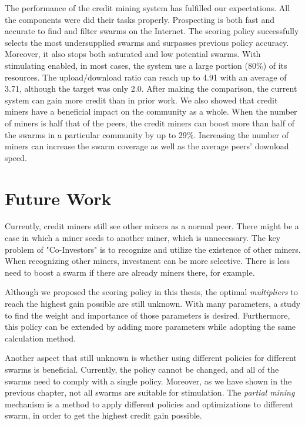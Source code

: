 The performance of the credit mining system has fulfilled our expectations. All the components were did their tasks properly. Prospecting is both fast and accurate to find and filter swarms on the Internet. The scoring policy successfully selects the most undersupplied swarms and surpasses previous policy accuracy. Moreover, it also stops both saturated and low potential swarms. With stimulating enabled, in most cases, the system use a large portion (80\%) of its resources. The upload/download ratio can reach up to 4.91 with an average of 3.71, although the target was only 2.0. After making the comparison, the current system can gain more credit than in prior work. We also showed that credit miners have a beneficial impact on the community as a whole. When the number of miners is half that of the peers, the credit miners can boost more than half of the swarms in a particular community by up to 29\%. Increasing the number of miners can increase the swarm coverage as well as the average peers' download speed.

\section{Future Work}
Currently, credit miners still see other miners as a normal peer. There might be a case in which a miner seeds to another miner, which is unnecessary. The key problem of "Co-Investors" is to recognize and utilize the existence of other miners. When recognizing other miners, investment can be more selective. There is less need to boost a swarm if there are already miners there, for example. 

Although we proposed the scoring policy in this thesis, the optimal \textit{multipliers} to reach the highest gain possible are still unknown. With many parameters, a study to find the weight and importance of those parameters is desired. Furthermore, this policy can be extended by adding more parameters while adopting the same calculation method.

Another aspect that still unknown is whether using different policies for different swarms is beneficial. Currently, the policy cannot be changed, and all of the swarms need to comply with a single policy. Moreover, as we have shown in the previous chapter, not all swarms are suitable for stimulation. The \textit{partial mining} mechanism is a method to apply different policies and optimizations to different swarm, in order to get the highest credit gain possible. 